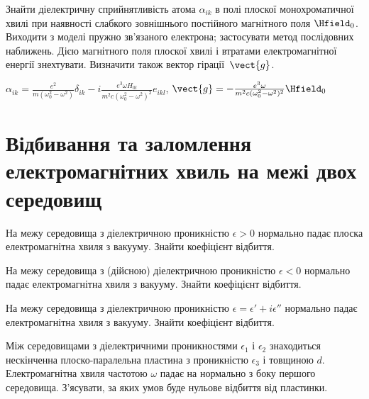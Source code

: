 \begin{problem}%
Знайти діелектричну сприйнятливість атома $\alpha_{ik}$ в полі плоскої монохроматичної хвилі при наявності слабкого зовнішнього постійного магнітного поля $\Hfield_0$. Виходити з моделі пружно зв'язаного електрона; застосувати метод послідовних наближень. Дією магнітного поля плоскої хвилі і втратами електромагнітної енергії знехтувати. Визначити також вектор гірації~$\vect{g}$.
\begin{solution}
	$\alpha_{ik} = \frac{e^2}{m(\omega_0^2 - \omega^2)}\delta_{ik} - i \frac{e^3\omega H_{0l}}{m^2c(\omega_0^2 - \omega^2)^2}e_{ikl}$, $\vect{g} = -\frac{e^3\omega}{m^2c(\omega_0^2 - \omega^2)^2}\Hfield_0$
\end{solution}
\end{problem}


\section{Відбивання та заломлення електромагнітних хвиль на межі двох середовищ}

\begin{problem}
На межу середовища з діелектричною проникністю $\epsilon > 0 $  нормально падає плоска електромагнітна хвиля з вакууму. Знайти коефіцієнт відбиття.
\end{problem}

\begin{problem}
На межу середовища з (дійсною) діелектричною проникністю  $\epsilon < 0 $  нормально падає електромагнітна хвиля з вакууму. Знайти коефіцієнт відбиття.
\end{problem}

\begin{problem}
На межу середовища з діелектричною проникністю $\epsilon = \epsilon' + i\epsilon''$  нормально падає електромагнітна хвиля з вакууму. Знайти коефіцієнт відбиття.
\end{problem}

\begin{problem}
Між середовищами з діелектричними проникностями $\epsilon_1$   і $\epsilon_2$   знаходиться нескінченна плоско-паралельна пластина з проникністю $\epsilon_3$  і товщиною  $d$. Електромагнітна хвиля частотою $\omega$ падає на нормально з боку першого середовища. З’ясувати, за яких умов буде нульове відбиття від пластинки.
\end{problem}


